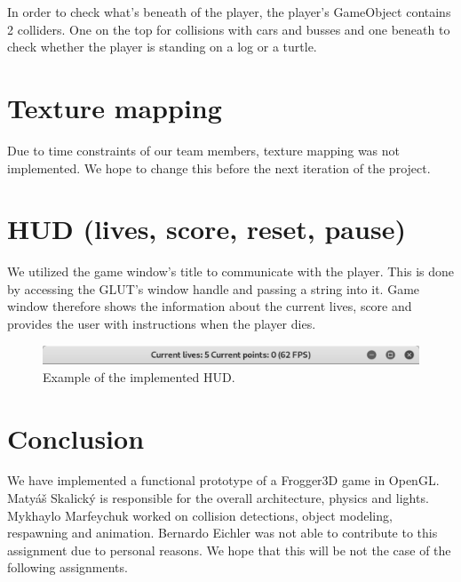 \documentclass[a4paper,10pt]{article}
\begin{document}
In order to check what's beneath of the player, the player's GameObject contains 2 colliders. One on the top for collisions with cars and busses and one beneath to check whether the player is standing on a log or a turtle.

\section{Texture mapping}
Due to time constraints of our team members, texture mapping was not implemented. We hope to change this before the next iteration of the project.

\section{HUD (lives, score, reset, pause)}
We utilized the game window's title to communicate with the player. This is done by accessing the GLUT's window handle and passing a string into it. Game window therefore shows the information about the current lives, score and provides the user with instructions when the player dies.

\begin{figure}[!htb]
	\centering
  	\includegraphics[width=\linewidth]{images/image2.png}
  	\caption{Example of the implemented HUD.}
\end{figure}


\section{Conclusion}
We have implemented a functional prototype of a Frogger3D game in OpenGL. Matyáš Skalický is responsible for the overall architecture, physics and lights. Mykhaylo Marfeychuk worked on collision detections, object modeling, respawning and animation. Bernardo Eichler was not able to contribute to this assignment due to personal reasons. We hope that this will be not the case of the following assignments.
\end{document}
